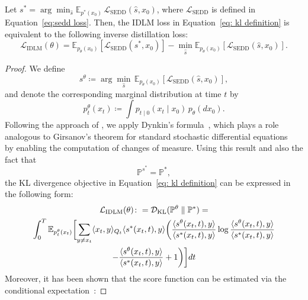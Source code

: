         \begin{theorem}
        \label{thm: unique solution for sedd}
            Let $s^* = \arg\min_{\widehat{s}} \mathbb{E}_{p^*(x_0)} \, \mathcal{L}_{\text{SEDD}}(\widehat{s}, x_0)$, where $\mathcal{L}_{\text{SEDD}}$ is defined in Equation~\eqref{eq:sedd loss}. Then, the IDLM loss in Equation~\eqref{eq: kl definition} is equivalent to the following inverse distillation loss:
            $$
            \mathcal{L}_{\text{IDLM}}(\theta) =
            \mathbb{E}_{ p_{\theta}(x_0)} \left[\mathcal{L}_{\text{SEDD}}(s^*, x_0)\right]
            - \min_{\widehat{s}} \mathbb{E}_{ p_{\theta}(x_0)} \left[\mathcal{L}_{\text{SEDD}}(\widehat{s}, x_0)\right].
            $$
        \end{theorem}
        \begin{proof}
            We define $$ s^{\theta} \coloneqq \arg\min_{\widehat{s}} \, \mathbb{E}_{ p_{\theta}(x_0)} \left[ \mathcal{L}_{\text{SEDD}}(\widehat{s}, x_0) \right], $$ and denote the corresponding marginal distribution at time $t$ by $$ p_t^{\theta}(x_t) \coloneqq \int p_{t \mid 0}(x_t \mid x_0) \, p_{\theta}(dx_0). $$ Following the approach of \citet{lou2024discrete}, we apply Dynkin’s formula~\citep{hanson2007applied, campbell2022continuous}, which plays a role analogous to Girsanov’s theorem for standard stochastic differential equations~\citep{oksendal2003stochastic} by enabling the computation of changes of measure. Using this result and also the fact that 
            $$
            \mathbb{P}^{s^*} = \mathbb{P}^*,
            $$ the KL divergence objective in Equation~\eqref{eq: kl definition} can be expressed in the following form:
            \begin{gather} 
                \mathcal{L}_{\text{IDLM}}(\theta) \colon= \mathcal{D}_{\text{KL}} (\mathbb{P}^{\theta} \parallel \mathbb{P}^*) = \nonumber\\
                \int_0^T \mathbb{E}_{p_t^{\theta}(x_t)} \biggl[\sum_{y \neq x_t} \langle x_t, y\rangle_{Q_t} \langle s^{*}(x_t,t), y\rangle\biggl(\frac{\langle s^{\theta}(x_t,t), y\rangle}{\langle s^{*}(x_t,t), y\rangle} \log \frac{\langle s^{\theta}(x_t,t), y\rangle}{\langle s^{*}(x_t,t), y\rangle} \nonumber \\ -  \frac{\langle s^{\theta}(x_t,t), y\rangle}{\langle s^{*}(x_t,t), y\rangle}  + 1\biggr)\biggr]dt \nonumber
            \end{gather}
            Moreover, it has been shown that the score function can be estimated via the conditional expectation~\citep{campbell2022continuous, lou2024discrete, meng2022concrete}:

\end{proof}
